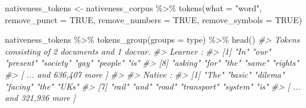 \documentclass[
]{article}
\newenvironment{Shaded}{\begin{snugshade}}{\end{snugshade}}
\newcommand{\AttributeTok}[1]{\textcolor[rgb]{0.77,0.63,0.00}{#1}}
\newcommand{\CommentTok}[1]{\textcolor[rgb]{0.56,0.35,0.01}{\textit{#1}}}
\newcommand{\ConstantTok}[1]{\textcolor[rgb]{0.00,0.00,0.00}{#1}}
\newcommand{\DecValTok}[1]{\textcolor[rgb]{0.00,0.00,0.81}{#1}}
\newcommand{\FunctionTok}[1]{\textcolor[rgb]{0.00,0.00,0.00}{#1}}
\newcommand{\NormalTok}[1]{#1}
\newcommand{\OtherTok}[1]{\textcolor[rgb]{0.56,0.35,0.01}{#1}}
\newcommand{\SpecialCharTok}[1]{\textcolor[rgb]{0.00,0.00,0.00}{#1}}
\newcommand{\StringTok}[1]{\textcolor[rgb]{0.31,0.60,0.02}{#1}}
\begin{document}
\begin{Shaded}
\end{Shaded}

\begin{Shaded}
\begin{Highlighting}[]
\NormalTok{nativeness\_tokens }\OtherTok{\textless{}{-}}\NormalTok{ nativeness\_corpus }\SpecialCharTok{\%\textgreater{}\%}
    \FunctionTok{tokens}\NormalTok{(}\AttributeTok{what =} \StringTok{"word"}\NormalTok{, }\AttributeTok{remove\_punct =} \ConstantTok{TRUE}\NormalTok{, }\AttributeTok{remove\_numbers =} \ConstantTok{TRUE}\NormalTok{, }\AttributeTok{remove\_symbols =} \ConstantTok{TRUE}\NormalTok{)}

\NormalTok{nativeness\_tokens }\SpecialCharTok{\%\textgreater{}\%}
    \FunctionTok{tokens\_group}\NormalTok{(}\AttributeTok{groups =}\NormalTok{ type) }\SpecialCharTok{\%\textgreater{}\%}
    \FunctionTok{head}\NormalTok{()}
\CommentTok{\#\textgreater{} Tokens consisting of 2 documents and 1 docvar.}
\CommentTok{\#\textgreater{} Learner :}
\CommentTok{\#\textgreater{}  [1] "In"      "our"     "present" "society" "gay"     "people"  "is"     }
\CommentTok{\#\textgreater{}  [8] "asking"  "for"     "the"     "same"    "rights" }
\CommentTok{\#\textgreater{} [ ... and 636,407 more ]}
\CommentTok{\#\textgreater{} }
\CommentTok{\#\textgreater{} Native :}
\CommentTok{\#\textgreater{}  [1] "The"       "basic"     "dilema"    "facing"    "the"       "UK\textquotesingle{}s"     }
\CommentTok{\#\textgreater{}  [7] "rail"      "and"       "road"      "transport" "system"    "is"       }
\CommentTok{\#\textgreater{} [ ... and 321,936 more ]}
\end{Highlighting}
\end{Shaded}
\end{document}
